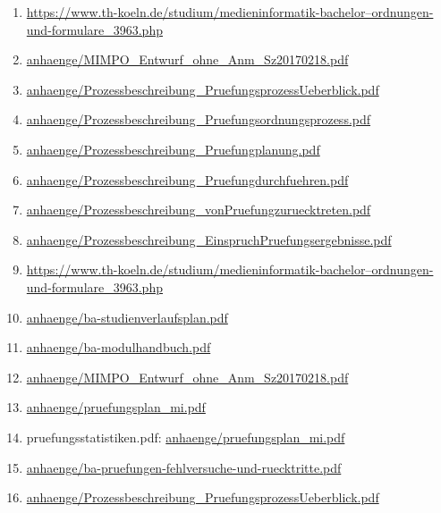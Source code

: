 \documentclass[BCOR12mm,DIV11,titlepage,a4paper,oneside,10pt]{scrbook}
\begin{document}
\begin{enumerate}
\item{\href{https://www.th-koeln.de/studium/medieninformatik-bachelor--ordnungen-und-formulare\_3963.php}{https://www.th-koeln.de/studium/medieninformatik-bachelor--ordnungen-und-formulare\_3963.php} } 
\item{\href{anhaenge/MIMPO\_Entwurf\_ohne\_Anm\_Sz20170218.pdf}{anhaenge/MIMPO\_Entwurf\_ohne\_Anm\_Sz20170218.pdf} } 
\item{\href{anhaenge/Prozessbeschreibung\_PruefungsprozessUeberblick.pdf}{anhaenge/Prozessbeschreibung\_PruefungsprozessUeberblick.pdf} } 
\item{\href{anhaenge/Prozessbeschreibung\_Pruefungsordnungsprozess.pdf}{anhaenge/Prozessbeschreibung\_Pruefungsordnungsprozess.pdf} } 
\item{\href{anhaenge/Prozessbeschreibung\_Pruefungplanung.pdf}{anhaenge/Prozessbeschreibung\_Pruefungplanung.pdf} } 
\item{\href{anhaenge/Prozessbeschreibung\_Pruefungdurchfuehren.pdf}{anhaenge/Prozessbeschreibung\_Pruefungdurchfuehren.pdf} } 
\item{\href{anhaenge/Prozessbeschreibung\_vonPruefungzuruecktreten.pdf}{anhaenge/Prozessbeschreibung\_vonPruefungzuruecktreten.pdf} } 
\item{\href{anhaenge/Prozessbeschreibung\_EinspruchPruefungsergebnisse.pdf}{anhaenge/Prozessbeschreibung\_EinspruchPruefungsergebnisse.pdf} } 
\item{\href{https://www.th-koeln.de/studium/medieninformatik-bachelor--ordnungen-und-formulare\_3963.php}{https://www.th-koeln.de/studium/medieninformatik-bachelor--ordnungen-und-formulare\_3963.php} } 
\item{\href{anhaenge/ba-studienverlaufsplan.pdf}{anhaenge/ba-studienverlaufsplan.pdf} } 
\item{\href{anhaenge/ba-modulhandbuch.pdf}{anhaenge/ba-modulhandbuch.pdf} } 
\item{\href{anhaenge/MIMPO\_Entwurf\_ohne\_Anm\_Sz20170218.pdf}{anhaenge/MIMPO\_Entwurf\_ohne\_Anm\_Sz20170218.pdf} } 
\item{\href{anhaenge/pruefungsplan\_mi.pdf}{anhaenge/pruefungsplan\_mi.pdf} } 
\item{pruefungsstatistiken.pdf: \href{anhaenge/pruefungsplan\_mi.pdf}{anhaenge/pruefungsplan\_mi.pdf} } 
\item{\href{anhaenge/ba-pruefungen-fehlversuche-und-ruecktritte.pdf}{anhaenge/ba-pruefungen-fehlversuche-und-ruecktritte.pdf} } 
\item{\href{anhaenge/Prozessbeschreibung\_PruefungsprozessUeberblick.pdf}{anhaenge/Prozessbeschreibung\_PruefungsprozessUeberblick.pdf} } 

\end{enumerate}
\end{document}
